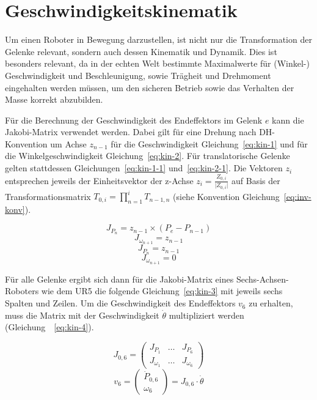\section{Geschwindigkeitskinematik}

Um einen Roboter in Bewegung darzustellen, ist nicht nur die Transformation der Gelenke relevant, sondern auch dessen Kinematik und Dynamik.
Dies ist besonders relevant, da in der echten Welt bestimmte Maximalwerte für (Winkel-) Geschwindigkeit und Beschleunigung, sowie Trägheit und Drehmoment eingehalten werden müssen, um den sicheren Betrieb sowie das Verhalten der Masse korrekt abzubilden.

Für die Berechnung der Geschwindigkeit des Endeffektors im Gelenk $e$ kann die Jakobi-Matrix verwendet werden.
Dabei gilt für eine Drehung nach DH-Konvention um Achse $z_{n-1}$ für die Geschwindigkeit Gleichung~\ref{eq:kin-1} und für die Winkelgeschwindigkeit Gleichung~\ref{eq:kin-2}.
Für translatorische Gelenke gelten stattdessen Gleichungen~\ref{eq:kin-1-1} und~\ref{eq:kin-2-1}.
Die Vektoren $z_{i}$ entsprechen jeweils der Einheitsvektor der z-Achse $z_{i} = \frac{Z_{0,i}}{\lvert Z_{0,i} \rvert}$ auf Basis der Transformationsmatrix $T_{0,i} = \prod_{n=1}^{i}T_{n-1,n}$ (siehe Konvention Gleichung~\ref{eq:inv-konv}).

\begin{equation}
    J_{P_{n}} = z_{n-1} \times (P_{e} - P_{n-1}) \label{eq:kin-1}
\end{equation}
\begin{equation}
    J_{\omega_{n+1}} = z_{n-1} \label{eq:kin-2}
\end{equation}
\begin{equation}
    J_{P_{n}} = z_{n-1} \label{eq:kin-1-1}
\end{equation}
\begin{equation}
    J_{\omega_{n+1}} = 0 \label{eq:kin-2-1}
\end{equation}

Für alle Gelenke ergibt sich dann für die Jakobi-Matrix eines Sechs-Achsen-Roboters wie dem UR5 die folgende Gleichung~\ref{eq:kin-3} mit jeweils sechs Spalten und Zeilen.
Um die Geschwindigkeit des Endeffektors $v_6$ zu erhalten, muss die Matrix mit der Geschwindigkeit $\dot{\theta}$ multipliziert werden (Gleichung~~\ref{eq:kin-4}).

\begin{equation}
    J_{0,6}=
    \begin{pmatrix}
        J_{P_1}      & \dots & J_{P_6}      \\
        J_{\omega_1} & \dots & J_{\omega_6}
    \end{pmatrix}\label{eq:kin-3}
\end{equation}
\begin{equation}
    v_6 =
    \begin{pmatrix}
        \dot{P}_{0,6} \\ \omega_6
    \end{pmatrix} =
    J_{0,6}\cdot\dot{\theta}
    \label{eq:kin-4}
\end{equation}